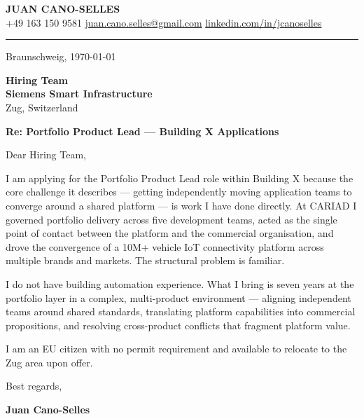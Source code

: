 \documentclass[a4paper,11pt]{article}
\begin{document}
{\Large\bfseries JUAN CANO-SELLES} \\[0.3em]
{\small
+49 163 150 9581 \quad
\href{mailto:juan.cano.selles@gmail.com}{juan.cano.selles@gmail.com} \quad
\href{https://www.linkedin.com/in/jcanoselles}{linkedin.com/in/jcanoselles}
}

\vspace{0.1em}
\noindent\rule{\textwidth}{0.6pt}

\vspace{1.2em}

{\small Braunschweig, \today}

\vspace{1.0em}

\textbf{Hiring Team} \\
\textbf{Siemens Smart Infrastructure} \\
Zug, Switzerland

\vspace{1.2em}

\textbf{Re: Portfolio Product Lead — Building X Applications}

\vspace{0.8em}

Dear Hiring Team,

I am applying for the Portfolio Product Lead role within Building X because the core challenge it describes — getting independently moving application teams to converge around a shared platform — is work I have done directly. At CARIAD I governed portfolio delivery across five development teams, acted as the single point of contact between the platform and the commercial organisation, and drove the convergence of a 10M+ vehicle IoT connectivity platform across multiple brands and markets. The structural problem is familiar.

I do not have building automation experience. What I bring is seven years at the portfolio layer in a complex, multi-product environment — aligning independent teams around shared standards, translating platform capabilities into commercial propositions, and resolving cross-product conflicts that fragment platform value.

I am an EU citizen with no permit requirement and available to relocate to the Zug area upon offer.

\vspace{0.5em}

Best regards,

\vspace{1.8em}

\textbf{Juan Cano-Selles}
\end{document}
